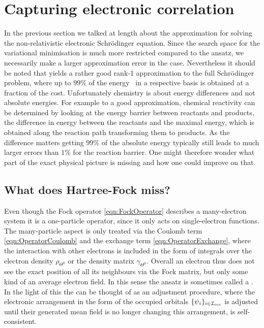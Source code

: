 \section{Capturing electronic correlation}
\label{sec:Correlation}

In the previous section we talked at length about the \HF approximation for solving
the non-relativistic electronic Schrödinger equation.
Since the search space for the variational minimisation is much more restricted compared
to the \FCI ansatz,
we necessarily make a larger approximation error in the \HF case.
Nevertheless it should be noted that \HF yields a rather good rank-1
approximation to the full Schrödinger problem,
where up to $99\%$ of the
\FCI energy~\cite{Jensen2007book} in a respective basis is obtained
at a fraction of the cost.
Unfortunately chemistry is about energy differences and not absolute energies.
For example to a good approximation,
chemical reactivity can be determined by looking at the
energy barrier between reactants and products,
\ie the difference in energy between the reactants
and the maximal energy,
which is obtained along the reaction path transforming them to products.
As the difference matters
getting $99\%$ of the absolute energy
typically still leads to much larger errors than $1\%$ for the reaction barrier.
One might therefore wonder
what part of the exact physical picture \HF is missing and how one could improve on that.

\subsection{What does Hartree-Fock miss?}
\label{sec:FailureHF}
Even though the
Fock operator \eqref{eqn:FockOperator} describes a many-electron system
it is a one-particle operator,
since it only acts on single-electron functions.
The many-particle aspect is only treated via the Coulomb term \eqref{eqn:OperatorCoulomb}
and the exchange term \eqref{eqn:OperatorExchange},
where the interaction with
other electrons is included in the form of integrals over
the electron density $\rho_{\Theta^0}$ or the density matrix $\gamma_{\Theta^0}$.
Overall an electron thus does not see the exact position of all its neighbours
via the Fock matrix,
but only some kind of an average electron field.
In this sense the \HF ansatz is sometimes called a .
In the light of this the \SCF can be thought of as an adjustment procedure,
where the electronic arrangement in the form of the occupied \SCF orbitals $\{\psi_i\}_{i\in\mathcal{I}_\text{occ}}$
is adjusted until their generated mean field
is no longer changing this arrangement,
\ie is self-consistent.

